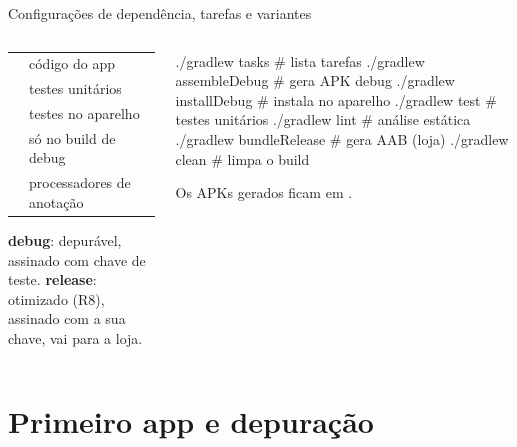 \documentclass[aspectratio=169,10pt]{beamer}
\begin{document}
\begin{frame}[fragile]{Configurações de dependência, tarefas e variantes}
  \begin{columns}[T]
    \begin{column}{0.5\textwidth}
      \footnotesize
      \begin{tabularx}{\linewidth}{@{}l L@{}}
        \toprule
         &  \\
        \midrule
         & código do app \\
         & testes unitários \\
         & testes no aparelho \\
         & só no build de debug \\
         & processadores de anotação \\
        \bottomrule
      \end{tabularx}
      \vspace{4pt}
      \begin{conceito}
        \textbf{debug}: depurável, assinado com chave de teste. \textbf{release}: otimizado (R8), assinado com a sua chave, vai para a loja.
      \end{conceito}
    \end{column}
    \begin{column}{0.48\textwidth}
\begin{terminal}[title=Tarefas pelo terminal]
./gradlew tasks            # lista tarefas
./gradlew assembleDebug    # gera APK debug
./gradlew installDebug     # instala no aparelho
./gradlew test             # testes unitários
./gradlew lint             # análise estática
./gradlew bundleRelease    # gera AAB (loja)
./gradlew clean            # limpa o build
\end{terminal}
      \begin{dica}
        Os APKs gerados ficam em .
      \end{dica}
    \end{column}
  \end{columns}
\end{frame}

\section{Primeiro app e depuração}
\end{document}
